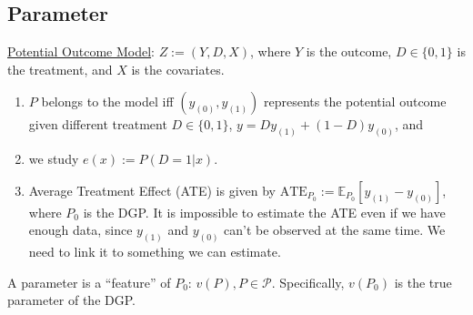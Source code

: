 \documentclass[11pt]{elegantbook}
\begin{document}
\subsection{Parameter}
\begin{example}
    \underline{Potential Outcome Model}: $Z:=(Y,D,X)$, where $Y$ is the outcome, $D\in\{0,1\}$ is the treatment, and $X$ is the covariates.
    \begin{enumerate}[$\circ$]
        \item $P$ belongs to the model iff $(y_{(0)},y_{(1)})$ represents the potential outcome given different treatment $D\in\{0,1\}$, $y=Dy_{(1)}+(1-D)y_{(0)}$, and
        \item we study $e(x):=P(D=1|x)$.
        \item Average Treatment Effect (ATE) is given by $\text{ATE}_{P_0}:=\mathbb{E}_{P_0}[y_{(1)}-y_{(0)}]$, where $P_0$ is the DGP. It is impossible to estimate the ATE even if we have enough data, since $y_{(1)}$ and $y_{(0)}$ can't be observed at the same time. We need to link it to something we can estimate.
    \end{enumerate}
\end{example}



\begin{definition}[Parameter]
    \normalfont
    A parameter is a ``feature'' of $P_0$: $v(P), P\in \mathcal{P}$. Specifically, $v(P_0)$ is the true parameter of the DGP.
\end{definition}
\end{document}
